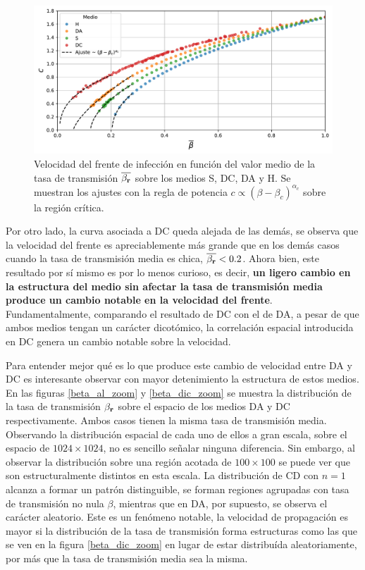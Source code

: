 \begin{figure}[h]
    \centering
    \includegraphics[width=\imsizeL]{c_all.pdf}
    \caption{Velocidad del frente de infección en función del valor medio de la tasa de transmisión $\overline{\beta_{\vb r}}$ sobre los medios S, DC, DA y 
    H. Se muestran los ajustes con la regla de potencia $c\propto(\beta-\beta_c)^{\alpha_c}$ sobre la región crítica.}
    \label{fig:c_all}
\end{figure}

Por otro lado, la curva asociada a DC queda alejada de las demás, se observa que la velocidad del frente es apreciablemente más grande que en los 
demás casos cuando la tasa de transmisión media es chica, $\overline{\beta_{\vb r}}<0.2$. Ahora bien, este resultado por sí mismo es por lo menos curioso, es decir,
\textbf{un ligero cambio en la estructura del medio sin afectar la tasa de transmisión media produce un cambio notable en la velocidad del frente}. Fundamentalmente, 
comparando el resultado de DC con el de DA, a pesar de que ambos medios tengan un carácter dicotómico, la correlación espacial introducida en DC genera 
un cambio notable sobre la velocidad.

Para entender mejor qué es lo que produce este cambio de velocidad entre DA y DC es interesante observar con mayor detenimiento la estructura de estos medios. En las 
figuras \ref{beta_al_zoom} y \ref{beta_dic_zoom} se muestra la distribución de la tasa de transmisión $\beta_{\vb r}$ sobre el espacio de los medios DA y DC respectivamente. 
Ambos casos tienen la misma tasa de transmisión media. Observando la distribución espacial de cada uno de ellos 
a gran escala, sobre el espacio de $1024\times1024$, no es sencillo señalar ninguna diferencia. Sin embargo, al observar la distribución sobre una región acotada de 
$100\times100$ se puede ver que son estructuralmente distintos en esta escala. La distribución de CD con $n=1$ alcanza a formar un patrón  
distinguible, se forman regiones agrupadas con tasa de transmisión no nula $\beta$, mientras que en DA, por supuesto, se observa el carácter aleatorio. Este es un 
fenómeno notable, la velocidad de propagación es mayor si la distribución de la tasa de transmisión forma estructuras como las que se ven en la figura 
\ref{beta_dic_zoom} en lugar de estar distribuída aleatoriamente, por más que la tasa de transmisión media sea la misma.

